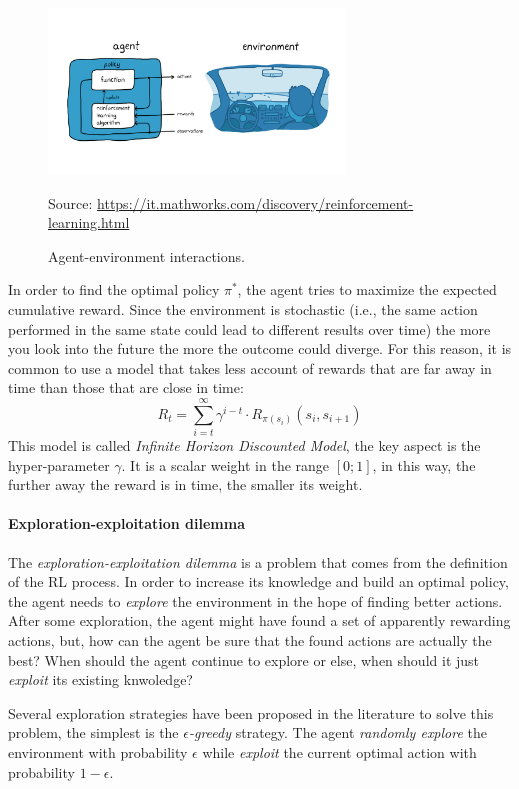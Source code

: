 \documentclass[12pt,a4paper,openright,twoside]{book}
\newcommand{\fonte}[1]{{\color{gray} \small \hypersetup{citecolor=gray} Source: #1}}
\begin{document}
\begin{figure}[t]
    \centering
    \includegraphics[width=0.7\textwidth]{figures/rl.png}
    \caption{Agent-environment interactions.}
    \fonte{\url{https://it.mathworks.com/discovery/reinforcement-learning.html}}
    \label{fig:rl_schema}
\end{figure}

In order to find the optimal policy $\pi^*$, the agent tries to maximize the expected cumulative reward.
    Since the environment is stochastic (i.e., the same action performed in the same state could lead to different 
    results over time) the more you look into the future the more the outcome could diverge.
    For this reason, it is common to use a model that takes less account of rewards that are far away in time 
    than those that are close in time:
    $$R_t = \sum_{i=t}^{\infty} \gamma^{i-t} \cdot R_{\pi(s_i)}(s_i, s_{i+1}) $$
    This model is called \emph{Infinite Horizon Discounted Model}, the key aspect is the hyper-parameter $\gamma$.
    It is a scalar weight in the range $[0;1]$, in this way, the further away the reward is in time, the smaller its weight.

\paragraph{Exploration-exploitation dilemma}

The \emph{exploration-exploitation dilemma} is a problem that comes from the definition of the RL process.
    In order to increase its knowledge and build an optimal policy, the agent needs to \emph{explore} the environment 
    in the hope of finding better actions. After some exploration, the agent might have found a set of 
    apparently rewarding actions, but, how can the agent be sure that the found actions are actually the best? 
    When should the agent continue to explore or else, when should it just \emph{exploit} its existing knwoledge?

Several exploration strategies have been proposed in the literature to solve this problem, the simplest is the
    \emph{$\epsilon$-greedy} strategy. The agent \emph{randomly explore} the environment with probability $\epsilon$
    while \emph{exploit} the current optimal action with probability $1-\epsilon$.
\end{document}
